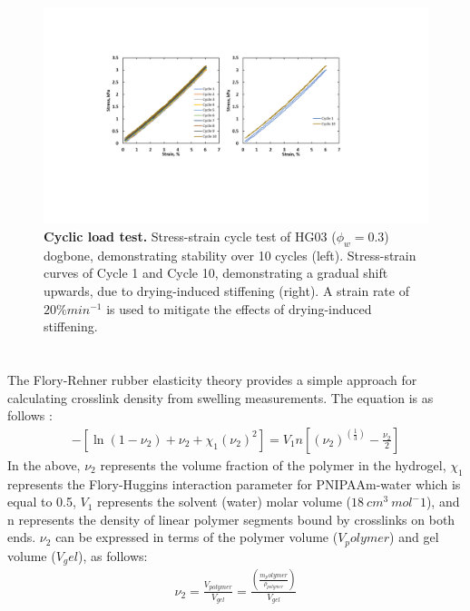 \begin{figure}[!th]
      \centering
      \includegraphics[width=\textwidth]{stressCycle.pdf}
      \caption[]{\textbf{Cyclic load test.} Stress-strain cycle test of HG03 ($\phi_{w}=0.3$) dogbone, demonstrating stability over 10 cycles (left). Stress-strain curves of Cycle 1 and Cycle 10, demonstrating a gradual shift upwards, due to drying-induced stiffening (right). A strain rate of $20\% min^{-1}$ is used to mitigate the effects of drying-induced stiffening.}
      \label{fig:stressCycle}
\end{figure}

\section{}
The Flory-Rehner rubber elasticity theory provides a simple approach for calculating crosslink density from swelling measurements. The equation is as follows :
\begin{align}
	-[\ln⁡(1-\nu_2)+\nu_2+\chi_1 (\nu_2 )^2 ]=V_1 n[(\nu_2 )^{(\frac{1}{3})}-\frac{\nu_2}{2}]
\end{align}
In the above, $\nu_{2}$ represents the volume fraction of the polymer in the hydrogel, $\chi_{1}$  represents the Flory-Huggins interaction parameter for PNIPAAm-water  which is equal to 0.5,  $V_{1}$ represents the solvent (water) molar volume ($18~cm^3~mol^-1$), and n represents the density of linear polymer segments bound by crosslinks on both ends. $\nu_{2}$ can be expressed in terms of the polymer volume ($V_polymer$) and gel volume ($V_gel$), as follows:
\begin{align}
	\nu_2=\frac{V_{polymer}}{V_{gel}} =\frac{(\frac{{m_polymer}}{\rho_{polymer}})}{V_{gel}} 
\end{align}

